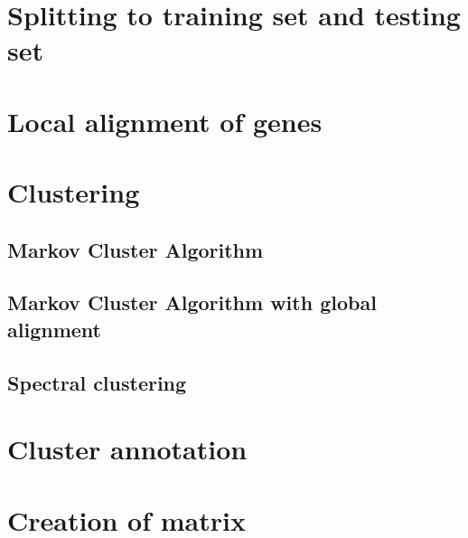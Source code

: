 \section{Splitting to training set and testing set}

\section{Local alignment of genes}

\section{Clustering}
\subsection{Markov Cluster Algorithm}
\subsection{Markov Cluster Algorithm with global alignment}
\subsection{Spectral clustering}

\section{Cluster annotation}

\section{Creation of matrix}
